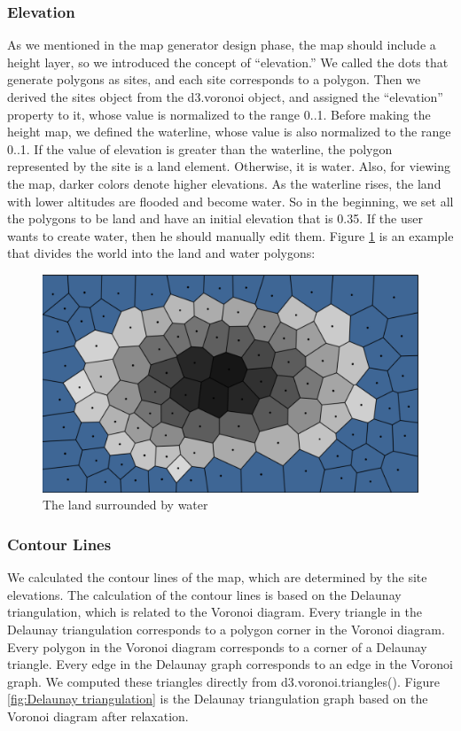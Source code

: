 \subsubsection{Elevation}
As we mentioned in the map generator design phase, the map should include a height layer, so we introduced the concept of ``elevation.'' We called the dots that generate polygons as sites, and each site corresponds to a polygon. Then we derived the sites object from the d3.voronoi object, and assigned the ``elevation'' property to it, whose value is normalized to the range 0..1. Before making the height map, we defined the waterline, whose value is also normalized to the range 0..1. If the value of elevation is greater than the waterline, the polygon represented by the site is a land element. Otherwise, it is water. Also, for viewing the map, darker colors denote higher elevations. As the waterline rises, the land with lower altitudes are flooded and become water. So in the beginning, we set all the polygons to be land and have an initial elevation that is 0.35. If the user wants to create water, then he should manually edit them. Figure \ref{fig:Height Map} is an example that divides the world into the land and water polygons:

\begin{figure}[htbp]
  \includegraphics[width=\textwidth]{section04/assets/Map-heightmap.png}
  \caption{The land surrounded by water}
  \label{fig:Height Map}
\end{figure}

\subsubsection{Contour Lines}
We calculated the contour lines of the map, which are determined by the site elevations. The calculation of the contour lines is based on the Delaunay triangulation, which is related to the Voronoi diagram. Every triangle in the Delaunay triangulation corresponds to a polygon corner in the Voronoi diagram. Every polygon in the Voronoi diagram corresponds to a corner of a Delaunay triangle. Every edge in the Delaunay graph corresponds to an edge in the Voronoi graph. We computed these triangles directly from d3.voronoi.triangles(). Figure \ref{fig:Delaunay triangulation} is the Delaunay triangulation graph based on the Voronoi diagram after relaxation.

